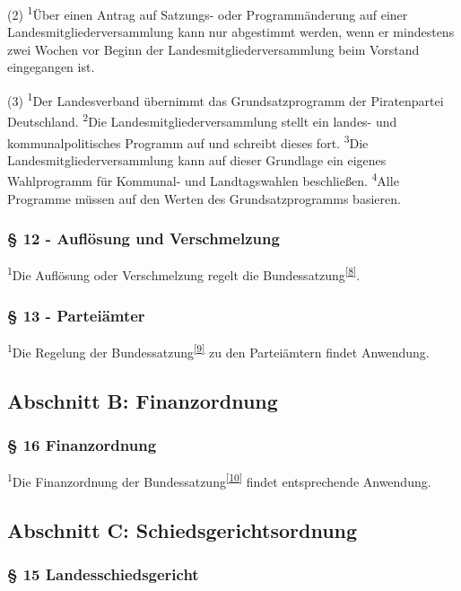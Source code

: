 (2) \textsuperscript{1}Über einen Antrag auf Satzungs- oder
Programmänderung auf einer Landesmitgliederversammlung kann nur
abgestimmt werden, wenn er mindestens zwei Wochen vor Beginn der
Landesmitgliederversammlung beim Vorstand eingegangen ist.

(3) \textsuperscript{1}Der Landesverband übernimmt das Grundsatzprogramm
der Piratenpartei Deutschland. \textsuperscript{2}Die
Landesmitgliederversammlung stellt ein landes- und kommunalpolitisches
Programm auf und schreibt dieses fort. \textsuperscript{3}Die
Landesmitgliederversammlung kann auf dieser Grundlage ein eigenes
Wahlprogramm für Kommunal- und Landtagswahlen beschließen.
\textsuperscript{4}Alle Programme müssen auf den Werten des
Grundsatzprogramms basieren.

\subsubsection{§ 12 - Auflösung und Verschmelzung}

\textsuperscript{1}Die Auflösung oder Verschmelzung regelt die
Bundessatzung\textsuperscript{\href{\#cite\_note-7}{{[}8{]}}}.

\subsubsection{§ 13 - Parteiämter}

\textsuperscript{1}Die Regelung der
Bundessatzung\textsuperscript{\href{\#cite\_note-8}{{[}9{]}}} zu den
Parteiämtern findet Anwendung.

\subsection{Abschnitt B: Finanzordnung}

\subsubsection{§ 16 Finanzordnung}

\textsuperscript{1}Die Finanzordnung der
Bundessatzung\textsuperscript{\href{\#cite\_note-9}{{[}10{]}}} findet
entsprechende Anwendung.

\subsection{Abschnitt C: Schiedsgerichtsordnung}

\subsubsection{§ 15 Landesschiedsgericht}


